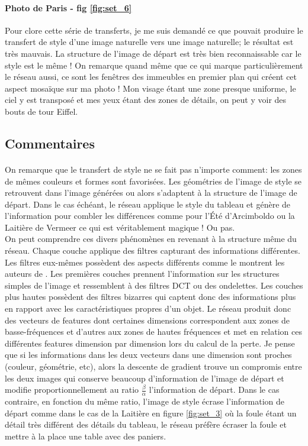 \documentclass{article}
\begin{document}
\paragraph*{Photo de Paris - fig \ref{fig:set_6}} Pour clore cette série de transferts, je me suis demandé ce que pouvait produire le transfert de style d'une image naturelle vers une image naturelle; le résultat est très mauvais. La structure de l'image de départ est très bien reconnaissable car le style est le même ! On remarque quand même que ce qui marque particulièrement le réseau aussi, ce sont les fenêtres des immeubles en premier plan qui créent cet aspect mosaïque sur ma photo ! Mon visage étant une zone presque uniforme, le ciel y est transposé et mes yeux étant des zones de détails, on peut y voir des bouts de tour Eiffel.

\subsection*{Commentaires}
\paragraph*{} On remarque que le transfert de style ne se fait pas n'importe comment: les zones de mêmes couleurs et formes sont favorisées. Les géométries de l'image de style se retrouvent dans l'image générées ou alors s'adaptent à la structure de l'image de départ. Dans le cas échéant, le réseau applique le style du tableau et génère de l'information pour combler les différences comme pour l’Été d'Arcimboldo ou la Laitière de Vermeer ce qui est véritablement magique ! Ou pas.\\
On peut comprendre ces divers phénomènes en revenant à la structure même du réseau. Chaque couche applique des filtres capturant des informations différentes. Les filtres eux-mêmes possèdent des aspects différents comme le montrent les auteurs de \cite{DBLP:journals/corr/ZeilerF13}. Les premières couches prennent l'information sur les structures simples de l'image et ressemblent à des filtres DCT ou des ondelettes. Les couches plus hautes possèdent des filtres bizarres qui captent donc des informations plus en rapport avec les caractéristiques propres d'un objet. Le réseau produit donc des vecteurs de features dont certaines dimensions correspondent aux zones de basse-fréquences et d'autres aux zones de hautes fréquences et met en relation ces différentes features dimension par dimension lors du calcul de la perte. Je pense que si les informations dans les deux vecteurs dans une dimension sont proches (couleur, géométrie, etc), alors la descente de gradient trouve un compromis entre les deux images qui conserve beaucoup d'information de l'image de départ et modifie proportionnellement au ratio $\frac{\beta}{\alpha}$ l'information de départ. Dans le cas contraire, en fonction du même ratio, l'image de style écrase l'information de départ comme dans le cas de la Laitière en figure \ref{fig:set_3} où la foule étant un détail très différent des détails du tableau, le réseau préfère écraser la foule et mettre à la place une table avec des paniers.
\end{document}
